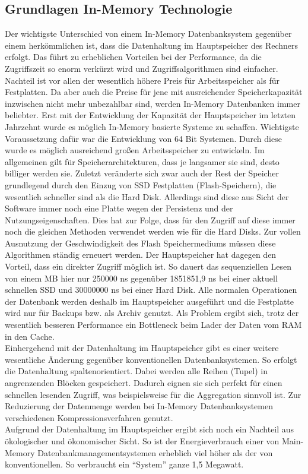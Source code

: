 \documentclass[a4paper, 12pt]{scrartcl}
\begin{document}
\subsection{Grundlagen In-Memory Technologie}
Der wichtigste Unterschied von einem In-Memory Datenbanksystem gegenüber einem herkömmlichen ist, dass die Datenhaltung im Hauptspeicher des Rechners erfolgt. Das führt zu erheblichen Vorteilen bei der Performance, da die Zugriffszeit so enorm verkürzt wird und Zugriffsalgorithmen sind einfacher. Nachteil ist vor allen der wesentlich höhere Preis für Arbeitsspeicher als für Festplatten. Da aber auch die Preise für jene mit ausreichender Speicherkapazität inzwischen nicht mehr unbezahlbar sind, werden In-Memory Datenbanken immer beliebter. Erst mit der Entwicklung der Kapazität der Hauptspeicher im letzten Jahrzehnt wurde es möglich In-Memory basierte Systeme zu schaffen. Wichtigste Voraussetzung dafür war die Entwicklung von 64 Bit Systemen. Durch diese wurde es möglich ausreichend großen Arbeitsspeicher zu entwickeln. Im allgemeinen gilt für Speicherarchitekturen, dass je langsamer sie sind, desto billiger werden sie. Zuletzt veränderte sich zwar auch der Rest der Speicher grundlegend durch den Einzug von SSD Festplatten (Flash-Speichern), die wesentlich schneller sind als die Hard Disk. Allerdings sind diese aus Sicht der Software immer noch eine Platte wegen der Persistenz und der Nutzungseigenschaften. Dies hat zur Folge, dass für den Zugriff auf diese immer noch die gleichen Methoden verwendet werden wie für die Hard Disks. Zur vollen Ausnutzung der Geschwindigkeit des Flash Speichermediums müssen diese Algorithmen ständig erneuert werden. Der Hauptspeicher hat dagegen den Vorteil, dass ein direkter Zugriff möglich ist. So dauert das sequenziellen Lesen von einem MB hier nur 250000 ns gegenüber 1851851,9 ns bei einer aktuell schnellen SSD und 30000000 ns bei einer Hard Disk. Alle normalen Operationen der Datenbank werden deshalb im Hauptspeicher ausgeführt und die Festplatte wird nur für Backups bzw. als Archiv genutzt. Als Problem ergibt sich, trotz der wesentlich besseren Performance ein Bottleneck beim Lader der Daten vom RAM in den Cache. \\Einhergehend mit der Datenhaltung im Hauptspeicher gibt es einer weitere wesentliche Änderung gegenüber konventionellen Datenbanksystemen. So erfolgt die Datenhaltung spaltenorientiert. Dabei werden alle Reihen (Tupel) in angrenzenden Blöcken gespeichert. Dadurch eignen sie sich perfekt für einen schnellen lesenden Zugriff, was beispielsweise für die Aggregation sinnvoll ist. Zur Reduzierung der Datenmenge werden bei In-Memory Datenbanksystemen verschiedenen Kompressionsverfahren genutzt. \\ Aufgrund der Datenhaltung im Hauptspeicher ergibt sich noch ein Nachteil aus ökologischer und ökonomischer Sicht. So ist der Energieverbrauch einer von Main-Memory Datenbankmanagementsystemen erheblich viel höher als der von konventionellen. So verbraucht ein "`System"' ganze 1,5 Megawatt. 
\end{document}
